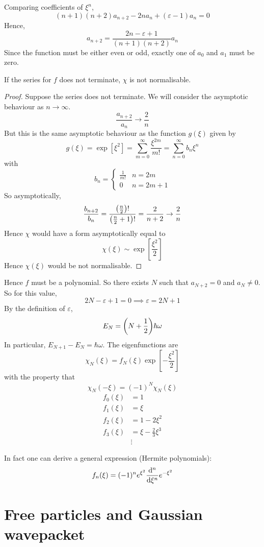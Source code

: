 \documentclass[a4paper,11pt]{article}
\begin{document}
Comparing coefficients of \( \xi^n \),
\[
	(n+1)(n+2) a_{n+2} - 2n a_n + (\varepsilon - 1) a_n = 0
\]
Hence,
\[
	a_{n+2} = \frac{2n - \varepsilon + 1}{(n+1)(n+2)} a_n
\]
Since the function must be either even or odd, exactly one of \( a_0 \) and \( a_1 \) must be zero.
\begin{proposition}
	If the series for \( f \) does not terminate, \( \chi \) is not normalisable.
\end{proposition}
\begin{proof}
	Suppose the series does not terminate.
	We will consider the asymptotic behaviour as \( n \to \infty \).
	\[
		\frac{a_{n+2}}{a_n} \to \frac{2}{n}
	\]
	But this is the same asymptotic behaviour as the function \( g(\xi) \) given by
	\[
		g(\xi) = \exp[\xi^2] = \sum_{m=0}^\infty \frac{\xi^{2m}}{m!} = \sum_{n=0}^\infty b_n \xi^n
	\]
	with
	\[
		b_n = \begin{cases}
			\frac{1}{m!} & n = 2m     \\
			0            & n = 2m + 1
		\end{cases}
	\]
	So asymptotically,
	\[
		\frac{b_{n+2}}{b_n} = \frac{\qty(\frac{n}{2})!}{\qty(\frac{n}{2} + 1)!} = \frac{2}{n+2} \to \frac{2}{n}
	\]
	Hence \( \chi \) would have a form asymptotically equal to
	\[
		\chi(\xi) \sim \exp[\frac{\xi^2}{2}]
	\]
	Hence \( \chi(\xi) \) would be not normalisable.
\end{proof}
Hence \( f \) must be a polynomial.
So there exists \( N \) such that \( a_{N+2} = 0 \) and \( a_N \neq 0 \).
So for this value,
\[
	2N - \varepsilon + 1 = 0 \implies \varepsilon = 2N + 1
\]
By the definition of \( \varepsilon \),
\[
	E_N = \qty(N + \frac{1}{2}) \hbar \omega
\]
In particular, \( E_{N+1} - E_N = \hbar \omega \).
The eigenfunctions are
\[
	\chi_N(\xi) = f_N(\xi) \exp[-\frac{\xi^2}{2}]
\]
with the property that
\[
	\chi_N(-\xi) = (-1)^N \chi_N(\xi)
\]
\begin{align*}
	f_0(\xi) & = 1                      \\
	f_1(\xi) & = \xi                    \\
	f_2(\xi) & = 1 - 2 \xi^2            \\
	f_3(\xi) & = \xi - \frac{2}{3}\xi^3 \\
	         & \vdots
\end{align*}

In fact one can derive a general expression (Hermite polynomials):
\[
f_n(\xi)=(-1)^n e^{\xi^2} \frac{\mathrm{d}^n}{\mathrm{d} \xi^n} e^{-\xi^2}
\]

\section{Free particles and Gaussian wavepacket}
\end{document}
